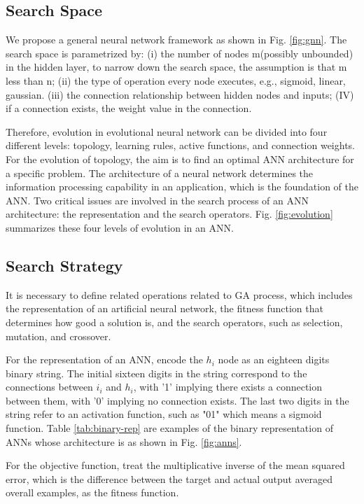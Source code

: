 \subsection{Search Space}
We propose a general neural network framework as shown in Fig. \ref{fig:gnn}. The search space
is parametrized by: (i) the number of nodes m(possibly unbounded) in the hidden
layer, to narrow down the search space, the assumption is that m less than n; (ii) the type of
operation every node executes, e.g., sigmoid, linear, gaussian. (iii) the
connection relationship between hidden nodes and inputs; (IV) if a connection
exists, the weight value in the connection.

Therefore, evolution in evolutional neural network can be divided into four different levels:
topology, learning rules, active functions, and connection weights. For the
evolution of topology, the aim is to find an optimal ANN architecture for a
specific problem. The architecture of a neural network determines the
information processing capability in an application, which is the foundation of
the ANN. Two critical issues are involved in the search process of an ANN
architecture: the representation and the search operators.
Fig. \ref{fig:evolution} summarizes these four levels of evolution in
an ANN.



\subsection{Search Strategy}
It is necessary to define related operations related to GA process, which
includes the representation of an artificial neural network, the fitness
function that determines how good a solution is, and the search operators, such
as selection, mutation, and crossover.

For the representation of an ANN, encode the $h_i$ node as an eighteen digits
binary string. The initial sixteen digits in the string correspond to the
connections between $i_i$ and $h_i$, with '1' implying there exists a
connection between them, with '0' implying no connection exists. The last two
digits in the string refer to an activation function, such as "01" which means a
sigmoid function. Table \ref{tab:binary-rep} are examples of the binary
representation of ANNs whose architecture is as shown in
Fig. \ref{fig:anns}. 

For the objective function, treat the multiplicative inverse of the mean
squared error, which is the difference between the target and actual output
averaged overall examples, as the fitness function.

